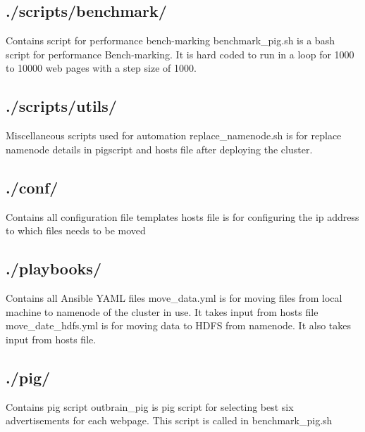 \documentclass[9pt,twocolumn,twoside]{../../styles/osajnl}
\begin{document}
\subsection{./scripts/benchmark/} Contains script for performance bench-marking
\newline benchmark\_pig.sh is a bash script for performance Bench-marking. It is hard coded to run in a loop for 1000 to 10000 web pages with a step size of 1000.
\subsection{./scripts/utils/} Miscellaneous scripts used for automation
\newline replace\_namenode.sh is for replace namenode details in pigscript and hosts file after deploying the cluster. 
\subsection{./conf/} Contains all configuration file templates
\newline hosts file is for configuring the ip address to which files needs to be moved
\subsection{./playbooks/} Contains all Ansible YAML files
\newline move\_data.yml is for moving files from local machine to namenode of the cluster in use. It takes input from hosts file
\newline move\_date\_hdfs.yml is for moving data to HDFS from namenode. It also takes input from hosts file.
\subsection{./pig/} Contains pig script
\newline outbrain\_pig is pig script for selecting best six advertisements for each webpage. This script is called in benchmark\_pig.sh
\end{document}
